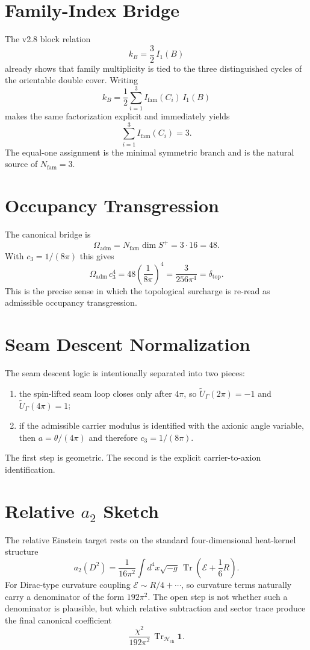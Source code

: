 \documentclass[11pt,a4paper]{article}
\theoremstyle{definition}
\theoremstyle{remark}
\newcommand{\cthree}{c_3}
\newcommand{\deltatop}{\delta_{\mathrm{top}}}
\newcommand{\tr}{\operatorname{Tr}}
\newcommand{\Hch}{\mathcal H_{\mathrm{ch}}}
\newcommand{\Oadm}{\Omega_{\mathrm{adm}}}
\begin{document}
\section{Family-Index Bridge}

The v2.8 block relation
\[
k_B=\frac32\,I_1(B)
\]
already shows that family multiplicity is tied to the three distinguished cycles of the orientable double cover. Writing
\[
k_B=\frac12\sum_{i=1}^{3} I_{\mathrm{fam}}(C_i)\,I_1(B)
\]
makes the same factorization explicit and immediately yields
\[
\sum_{i=1}^{3} I_{\mathrm{fam}}(C_i)=3.
\]
The equal-one assignment is the minimal symmetric branch and is the natural source of $N_{\mathrm{fam}}=3$.

\section{Occupancy Transgression}

The canonical bridge is
\[
\Oadm = N_{\mathrm{fam}}\dim S^+ = 3\cdot 16 = 48.
\]
With $\cthree=1/(8\pi)$ this gives
\[
\Oadm\,\cthree^4
= 48\left(\frac{1}{8\pi}\right)^4
= \frac{3}{256\pi^4}
= \deltatop.
\]
This is the precise sense in which the topological surcharge is re-read as admissible occupancy transgression.

\section{Seam Descent Normalization}

The seam descent logic is intentionally separated into two pieces:
\begin{enumerate}[leftmargin=1.5em, topsep=3pt, itemsep=2pt]
    \item the spin-lifted seam loop closes only after $4\pi$, so $\widetilde U_\Gamma(2\pi)=-1$ and $\widetilde U_\Gamma(4\pi)=1$;
    \item if the admissible carrier modulus is identified with the axionic angle variable, then $a=\theta/(4\pi)$ and therefore $\cthree=1/(8\pi)$.
\end{enumerate}
The first step is geometric. The second is the explicit carrier-to-axion identification.

\section{Relative \texorpdfstring{$a_2$}{a2} Sketch}

The relative Einstein target rests on the standard four-dimensional heat-kernel structure
\[
a_2(D^2)=\frac{1}{16\pi^2}\int d^4x\sqrt{-g}\,
\tr\!\left(\mathcal E+\frac16 R\right).
\]
For Dirac-type curvature coupling $\mathcal E\sim R/4+\cdots$, so curvature terms naturally carry a denominator of the form $192\pi^2$. The open step is not whether such a denominator is plausible, but which relative subtraction and sector trace produce the final canonical coefficient
\[
\frac{\chi^2}{192\pi^2}\,\tr_{\Hch}\mathbf 1.
\]
\end{document}
